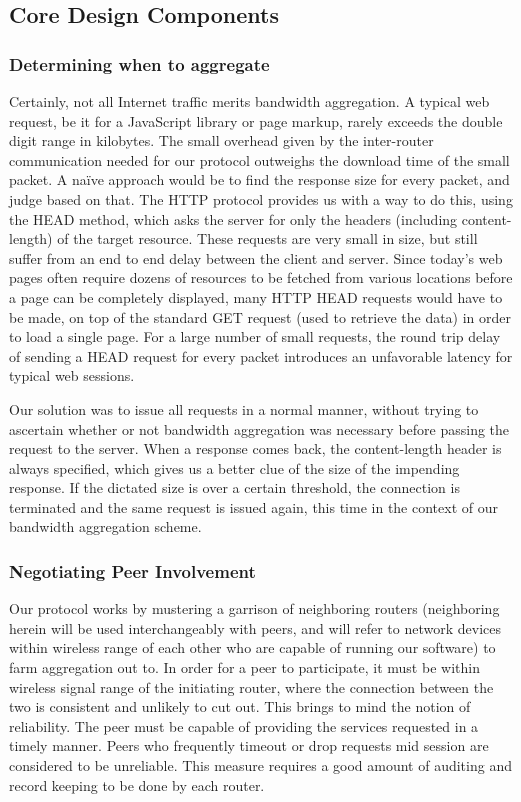 \documentclass[12pt]{article}
\begin{document}
	\subsection{Core Design Components}

		\subsubsection{Determining when to aggregate}

			Certainly, not all Internet traffic merits bandwidth aggregation. A typical web request, be it for a JavaScript library or page markup, rarely exceeds the double digit range in kilobytes. The small overhead given by the inter-router communication needed for our protocol outweighs the download time of the small packet. A na\"{i}ve approach would be to find the response size for every packet, and judge based on that. The HTTP protocol provides us with a way to do this, using the HEAD method, which asks the server for only the headers (including content-length) of the target resource. These requests are very small in size, but still suffer from an end to end delay between the client and server. Since today's web pages often require dozens of resources to be fetched from various locations before a page can be completely displayed, many HTTP HEAD requests would have to be made, on top of the standard GET request (used to retrieve the data) in order to load a single page. For a large number of small requests, the round trip delay of sending a HEAD request for every packet introduces an unfavorable latency for typical web sessions. 

			Our solution was to issue all requests in a normal manner, without trying to ascertain whether or not bandwidth aggregation was necessary before passing the request to the server. When a response comes back, the content-length header is always specified, which gives us a better clue of the size of the impending response. If the dictated size is over a certain threshold, the connection is terminated and the same request is issued again, this time in the context of our bandwidth aggregation scheme.

		\subsubsection{Negotiating Peer Involvement}

			Our protocol works by mustering a garrison of neighboring routers (neighboring herein will be used interchangeably with peers, and will refer to network devices within wireless range of each other who are capable of running our software) to farm aggregation out to. In order for a peer to participate, it must be within wireless signal range of the initiating router, where the connection between the two is consistent and unlikely to cut out. This brings to mind the notion of reliability. The peer must be capable of providing the services requested in a timely manner. Peers who frequently timeout or drop requests mid session are considered to be unreliable. This measure requires a good amount of auditing and record keeping to be done by each router.
\end{document}
